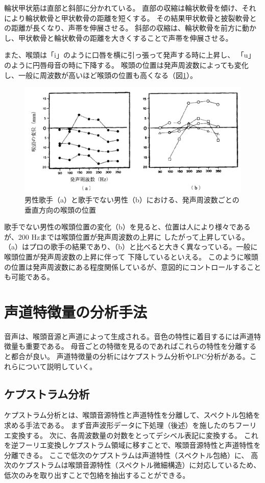 \documentclass[12ptj,a4j,dvipdfmx,uplatex, titlepage]{jsarticle}
\begin{document}
輪状甲状筋は直部と斜部に分かれている。
直部の収縮は輪状軟骨を傾け、それにより輪状軟骨と甲状軟骨の距離を短くする。
その結果甲状軟骨と披裂軟骨との距離が長くなり、声帯を伸展させる。
斜部の収縮は、輪状軟骨を前方に動かし、甲状軟骨と輪状軟骨の距離を大きくすることで声帯を伸展させる。

また、喉頭は「i」のように口唇を横に引っ張って発声する時に上昇し、
「u」のように円唇母音の時に下降する。
喉頭の位置は発声周波数によっても変化し、一般に周波数が高いほど喉頭の位置も高くなる（図\ref{fig:koto}）。

\begin{figure}[htbp]
    \begin{center}
      \includegraphics[clip,width=12.0cm]{喉頭位置.png}
      \caption{男性歌手（a）と歌手でない男性（b）における、発声周波数ごとの垂直方向の喉頭の位置\cite{science}}
      \label{fig:koto}
    \end{center}
\end{figure}

歌手でない男性の喉頭位置の変化（b）を見ると、位置は人により様々であるが、200 \si{Hz}までは喉頭位置が発声周波数の上昇に
したがって上昇している。
（a）はプロの歌手の結果であり、（b）と比べると大きく異なっている。一般に喉頭位置が発声周波数の上昇に伴って
下降しているといえる。
このように喉頭の位置は発声周波数にある程度関係しているが、意図的にコントロールすることも可能である。



\section{声道特徴量の分析手法}

音声は、喉頭音源と声道によって生成される。音色の特性に着目するには声道特徴量も重要である。
母音ごとの特徴を見るのであればこれらの特性を分離すると都合が良い。
声道特徴量の分析にはケプストラム分析やLPC分析がある。これらについて説明していく。

\subsection{ケプストラム分析}
ケプストラム分析とは、喉頭音源特性と声道特性を分離して、スペクトル包絡を求める手法である。
まず音声波形データに下処理（後述）を施したのちフーリエ変換する。
次に、各周波数量の対数をとってデシベル表記に変換する。
これを逆フーリエ変換しケプストラム領域に移すことで、喉頭音源特性と声道特性を分離できる。
ここで低次のケプストラムは声道特性（スペクトル包絡）に、
高次のケプストラムは喉頭音源特性（スペクトル微細構造）に対応しているため、
低次のみを取り出すことで包絡を抽出することができる。
\end{document}
